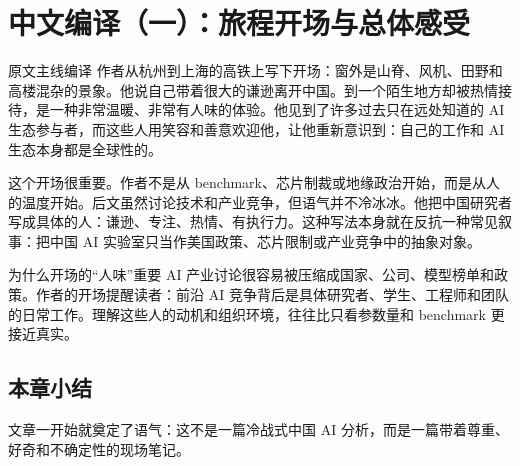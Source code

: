 \section{中文编译（一）：旅程开场与总体感受}

\begin{translationbox}{原文主线编译}
作者从杭州到上海的高铁上写下开场：窗外是山脊、风机、田野和高楼混杂的景象。他说自己带着很大的谦逊离开中国。到一个陌生地方却被热情接待，是一种非常温暖、非常有人味的体验。他见到了许多过去只在远处知道的 AI 生态参与者，而这些人用笑容和善意欢迎他，让他重新意识到：自己的工作和 AI 生态本身都是全球性的。
\end{translationbox}

这个开场很重要。作者不是从 benchmark、芯片制裁或地缘政治开始，而是从人的温度开始。后文虽然讨论技术和产业竞争，但语气并不冷冰冰。他把中国研究者写成具体的人：谦逊、专注、热情、有执行力。这种写法本身就在反抗一种常见叙事：把中国 AI 实验室只当作美国政策、芯片限制或产业竞争中的抽象对象。

\begin{knowledgebox}{为什么开场的``人味''重要}
AI 产业讨论很容易被压缩成国家、公司、模型榜单和政策。作者的开场提醒读者：前沿 AI 竞争背后是具体研究者、学生、工程师和团队的日常工作。理解这些人的动机和组织环境，往往比只看参数量和 benchmark 更接近真实。
\end{knowledgebox}

\subsection{本章小结}

文章一开始就奠定了语气：这不是一篇冷战式中国 AI 分析，而是一篇带着尊重、好奇和不确定性的现场笔记。


